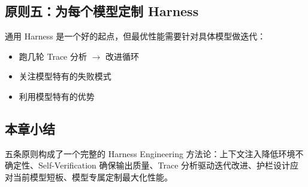 \subsection{原则五：为每个模型定制 Harness}

通用 Harness 是一个好的起点，但最优性能需要针对具体模型做迭代：
\begin{itemize}[leftmargin=1.5em]
    \item 跑几轮 Trace 分析 $\rightarrow$ 改进循环
    \item 关注模型特有的失败模式
    \item 利用模型特有的优势
\end{itemize}

\subsection{本章小结}

五条原则构成了一个完整的 Harness Engineering 方法论：上下文注入降低环境不确定性、Self-Verification 确保输出质量、Trace 分析驱动迭代改进、护栏设计应对当前模型短板、模型专属定制最大化性能。


